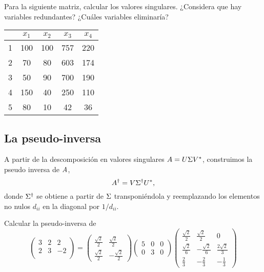\begin{ejercicio}
Para la siguiente matriz, calcular los valores singulares. ¿Considera que hay variables redundantes? ¿Cuáles variables eliminaría?
\begin{center}
 \begin{tabular}{||c c c c c||}
 \hline
  & $x_1$ & $x_2$ & $x_3$ & $x_4$ \\ [0.5ex]
 \hline\hline
 1 & 100 & 100 & 757  & 220\\
 \hline
 2 & 70 & 80 & 603 & 174 \\
 \hline
 3 & 50 & 90 & 700 & 190 \\
 \hline
 4 & 150 & 40 & 250 & 110 \\
 \hline
 5 & 80 & 10 & 42 & 36 \\ [1ex]
 \hline
\end{tabular}
\end{center}
\end{ejercicio}

\subsection{La pseudo-inversa}

A partir de la descomposición en valores singulares $\Ab = \Ub \Sigma \Vb^*$,
construimos la pseudo inversa de $\Ab$,
$$
\Ab^\dagger = \Vb \Sigmab^\dagger \Ub^*,
$$ 
donde $\Sigmab^\dagger$ se obtiene a partir de $\Sigmab$ transponiéndola y
reemplazando los elementos no nulos $d_{ii}$ en la diagonal por
$1 / d_{ii}$.

\begin{ejercicio} Calcular la pseudo-inversa de
$$
\begin{pmatrix}
3 & 2 & 2 \\
2 & 3 & -2 \\
\end{pmatrix} = \begin{pmatrix}
\frac{\sqrt2}{2} & \frac{\sqrt2}{2} \\
\frac{\sqrt2}{2} & -\frac{\sqrt2}{2}
\end{pmatrix} \begin{pmatrix}
5 & 0 & 0 \\
0 & 3 & 0
\end{pmatrix}
\begin{pmatrix}
\frac{\sqrt2}{2} & \frac{\sqrt2}{2} & 0 \\
\frac{\sqrt2}{6} & -\frac{\sqrt2}{6} & \frac{2\sqrt2}{3} \\
\frac23 & -\frac23 & -\frac13
\end{pmatrix}
$$
\end{ejercicio}

